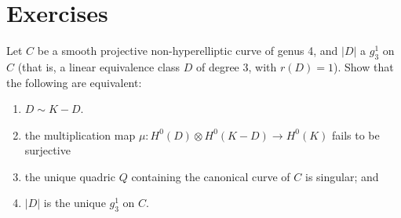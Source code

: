 %
%
%
%
\section{Exercises}

\begin{exercise} \label{ex7.1}
Let $C$ be a smooth projective non-hyperelliptic curve of genus 4, and $|D|$ a $g^1_3$ on $C$ (that is, a linear equivalence class $D$ of degree 3, with $r(D) = 1$). Show that the following are equivalent:
\begin{enumerate}
\item $D \sim K-D$. 
\item the multiplication map $\mu : H^0(D) \otimes H^0(K-D) \to H^0(K)$ fails to be surjective
\item the unique quadric $Q$ containing the canonical curve of $C$ is singular; and
\item $|D|$ is the unique $g^1_3$ on $C$.
\end{enumerate}
\end{exercise}

